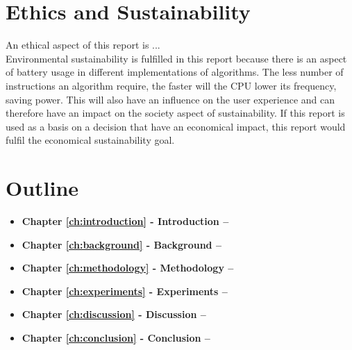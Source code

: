 \section{Ethics and Sustainability}
An ethical aspect of this report is ...\\

Environmental sustainability is fulfilled in this report because there is an aspect of battery usage in different implementations of algorithms. The less number of instructions an algorithm require, the faster will the CPU lower its frequency, saving power. This will also have an influence on the user experience and can therefore have an impact on the society aspect of sustainability. If this report is used as a basis on a decision that have an economical impact, this report would fulfil the economical sustainability goal.

\section{Outline}
\begin{itemize}
    \item \textbf{Chapter \ref{ch:introduction} - Introduction --}
    \item \textbf{Chapter \ref{ch:background} - Background --}
    \item \textbf{Chapter \ref{ch:methodology} - Methodology --}
    \item \textbf{Chapter \ref{ch:experiments} - Experiments --}
    \item \textbf{Chapter \ref{ch:discussion} - Discussion --}
    \item \textbf{Chapter \ref{ch:conclusion} - Conclusion --}
\end{itemize}
